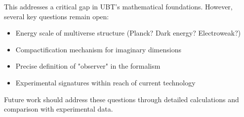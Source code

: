 This addresses a critical gap in UBT's mathematical foundations. However, several key questions remain open:
\begin{itemize}
\item Energy scale of multiverse structure (Planck? Dark energy? Electroweak?)
\item Compactification mechanism for imaginary dimensions
\item Precise definition of "observer" in the formalism
\item Experimental signatures within reach of current technology
\end{itemize}

Future work should address these questions through detailed calculations and comparison with experimental data.
